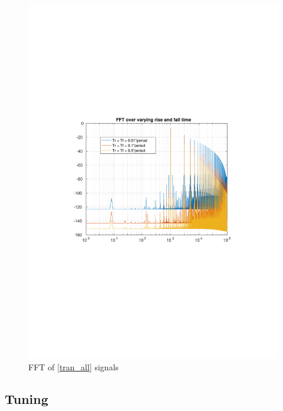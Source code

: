 \documentclass[12pt,a4paper,UKenglish]{article}
\begin{document}
\begin{figure} [htbp]
  \centering 
  \includegraphics[width=\textwidth]{img/2b_fft.pdf} 
  \caption{FFT of \ref{tran_all} signals}
  \label{fft_all} 
\end{figure}
\subsection{Tuning}
\end{document}
